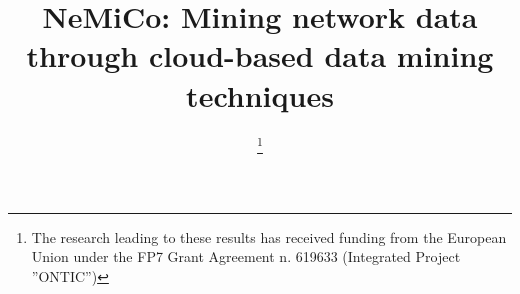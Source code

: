 \documentclass[conference]{IEEEtran}
\newcommand{\Nemico}{{\sc NeMiCo}}
\begin{document}
%
\title{{\Nemico : Mining network data through cloud-based data mining techniques}}




\author{
\thanks{The research leading to these results has received funding from the European Union 
under the FP7 Grant Agreement n. 619633 (Integrated Project ''ONTIC'')
}}

\IEEEoverridecommandlockouts


% 




\end{document}
